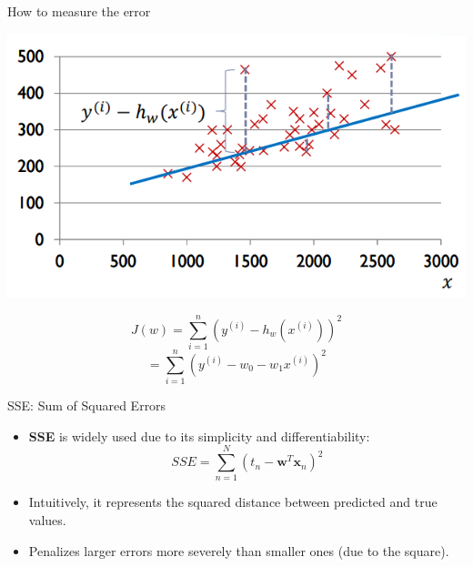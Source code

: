 \documentclass[serif, aspectratio=169]{beamer}
\begin{document}
\begin{frame}{How to measure the error}

\begin{minipage}{0.5\textwidth}
    \centering
    \includegraphics[width=\textwidth]{pic/6.png}
\end{minipage}%
\begin{minipage}{0.5\textwidth}

    \[
    J(w) = \sum_{i=1}^{n} \left( y^{(i)} - h_w(x^{(i)}) \right)^2
    \]
    \[
    = \sum_{i=1}^{n} \left( y^{(i)} - w_0 - w_1 x^{(i)} \right)^2
    \]
\end{minipage}
\end{frame}

\begin{frame}{SSE: Sum of Squared Errors}
    \begin{itemize}
        \item \textbf{SSE} is widely used due to its simplicity and differentiability:
        \[
        SSE = \sum_{n=1}^{N} \left( t_n - \mathbf{w}^T \mathbf{x}_n \right)^2
        \]
        \item Intuitively, it represents the squared distance between predicted and true values.
        \item Penalizes larger errors more severely than smaller ones (due to the square).
    \end{itemize}
\end{frame}
\end{document}
